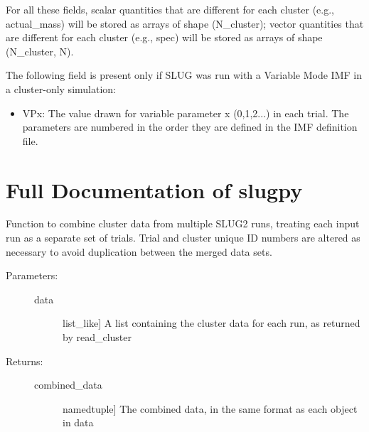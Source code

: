 \documentclass[letterpaper,10pt,english]{sphinxmanual}
\begin{document}
For all these fields, scalar quantities that are different for each cluster (e.g., actual\_mass) will be stored as arrays of shape (N\_cluster); vector quantities that are different for each cluster (e.g., spec) will be stored as arrays of shape (N\_cluster, N).

The following field is present only if SLUG was run with a Variable Mode IMF in a cluster-only simulation:
\begin{itemize}
\item {} 
VPx: The value drawn for variable parameter x (0,1,2...) in each trial. The parameters are numbered in the order they are defined in the IMF definition file.

\end{itemize}


\section{Full Documentation of slugpy}
\label{slugpy:module-slugpy}\label{slugpy:full-documentation-of-slugpy}

\begin{fulllineitems}
\label{slugpy:slugpy.combine_cluster}
Function to combine cluster data from multiple SLUG2 runs,
treating each input run as a separate set of trials. Trial and
cluster unique ID numbers are altered as necessary to avoid
duplication between the merged data sets.
\begin{description}
\item[{Parameters:}] \leavevmode\begin{description}
\item[{data}] \leavevmode{[}list\_like{]}
A list containing the cluster data for each run, as
returned by read\_cluster

\end{description}

\item[{Returns:}] \leavevmode\begin{description}
\item[{combined\_data}] \leavevmode{[}namedtuple{]}
The combined data, in the same format as each object in data

\end{description}

\end{description}

\end{fulllineitems}
\end{document}

